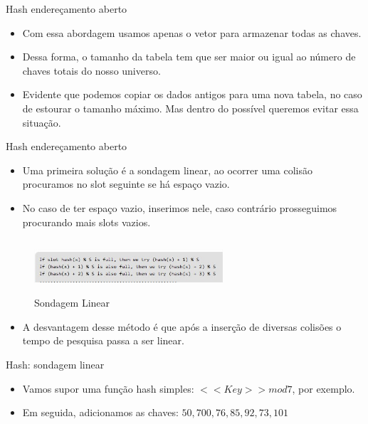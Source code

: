 \begin{frame}
	\begin{block}{Hash endereçamento aberto}
		\begin{itemize}
			\item Com essa abordagem usamos apenas o vetor para armazenar todas as chaves. 

			\item Dessa forma, o tamanho da tabela tem que ser maior ou igual ao número de chaves totais do nosso universo. 
			
			\item Evidente que podemos copiar os dados antigos para uma nova tabela, no caso de estourar o tamanho máximo. Mas dentro do possível queremos evitar essa situação.
		\end{itemize}
	\end{block}
\end{frame}

\begin{frame}
	\begin{block}{Hash endereçamento aberto}
		\begin{itemize}
			\item Uma primeira solução é a sondagem linear, ao ocorrer uma colisão procuramos no slot seguinte se há espaço vazio. 

			\item No caso de ter espaço vazio, inserimos nele, caso contrário prosseguimos procurando mais slots vazios.
		\end{itemize}
		\begin{figure}[!htb]
			\centering	  				
			\includegraphics[height=2cm, width = 7cm]{./pic/sondagemLinearCode.jpg}
			\caption{Sondagem Linear  \cite{GEEKS_2018}}
		\end{figure}
				
		\begin{itemize}	
			\item A desvantagem desse método é que após a inserção de diversas colisões o tempo de pesquisa passa a ser linear.
		\end{itemize}
	\end{block}
\end{frame}

\begin{frame}
	\begin{block}{Hash: sondagem linear}
		\begin{itemize}
			\item Vamos supor uma função hash simples: $<<Key>> mod 7$, por exemplo. 
			
			\item Em seguida, adicionamos as chaves: $ 50, 700, 76, 85, 92, 73, 101$

		\end{itemize}
	\end{block}
\end{frame}

